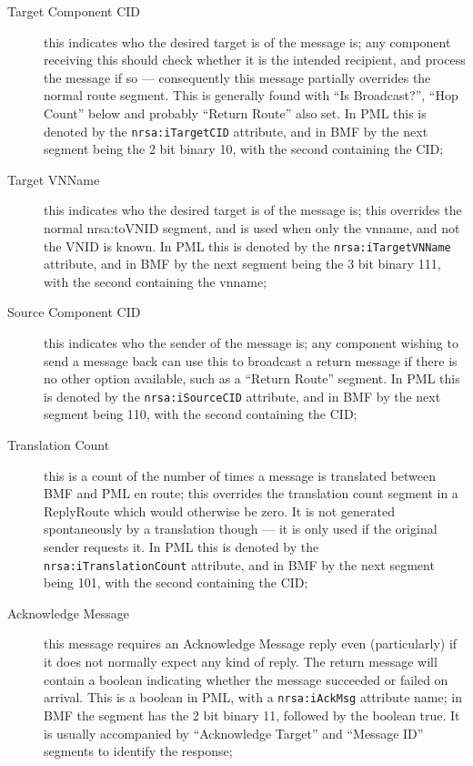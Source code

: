 \documentclass[pdftex,a4paper]{article}
\newcommand{\XMLfont}[1]{{\tt \small #1}}
\begin{document}
\begin{description}
\item[Target Component CID] this indicates who the desired target is
  of the message is; any component receiving this should check whether
  it is the intended recipient, and process the message if so ---
  consequently this message partially overrides the normal route
  segment. This is generally found with ``Is Broadcast?'', ``Hop
  Count'' below and probably ``Return Route'' also set. In PML this
  is denoted by the \XMLfont{nrsa:iTargetCID} attribute, and in BMF by
  the next segment being the 2 bit binary 10, with the second
  containing the CID;

\item[Target VNName] this indicates who the desired target is of the
  message is; this overrides the normal nrsa:toVNID segment, and is used
  when only the vnname, and not the VNID is known. In PML this is
  denoted by the \XMLfont{nrsa:iTargetVNName} attribute, and in BMF by
  the next segment being the 3 bit binary 111, with the second
  containing the vnname;

\item[Source Component CID] this indicates who the sender of the
  message is; any component wishing to send a message back can use
  this to broadcast a return message if there is no other option
  available, such as a ``Return Route'' segment. In PML this is
  denoted by the \XMLfont{nrsa:iSourceCID} attribute, and in BMF by
  the next segment being 110, with the second containing the CID;

\item[Translation Count] this is a count of the number of times a
  message is translated between BMF and PML en route; this overrides
  the translation count segment in a ReplyRoute which would otherwise
  be zero. It is not generated spontaneously by a translation though
  --- it is only used if the original sender requests it. In PML this
  is denoted by the \XMLfont{nrsa:iTranslationCount} attribute, and in
  BMF by the next segment being 101, with the second containing the
  CID;

\item[Acknowledge Message] this message requires an Acknowledge
  Message reply even (particularly) if it does not normally expect any
  kind of reply. The return message will contain a boolean indicating
  whether the message succeeded or failed on arrival. This is a
  boolean in PML, with a \XMLfont{nrsa:iAckMsg} attribute name; in BMF the
  segment has the 2 bit binary 11, followed by the boolean true. It is
  usually accompanied by ``Acknowledge Target'' and ``Message ID''
  segments to identify the response;


\end{description}
\end{document}
